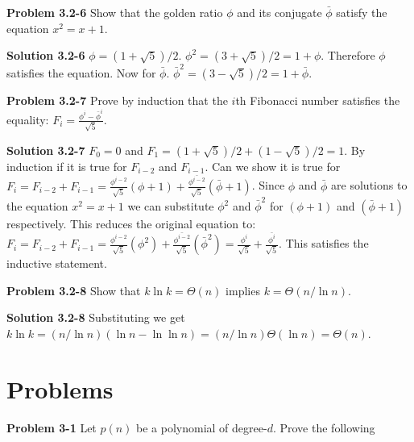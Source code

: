 \documentclass{article}
\newcommand*\conj[1]{\bar{#1}}
\begin{document}
\hrulefill

\medskip

\textbf{Problem 3.2-6} Show that the golden ratio $\phi$ and its conjugate $\conj{\phi}$ satisfy the equation $x^2 = x + 1$.

\medskip

\textbf{Solution 3.2-6} $\phi = (1 + \sqrt{5})/2$. $\phi^2 = (3 + \sqrt{5})/2 = 1 + \phi$. Therefore $\phi$ satisfies the equation. Now for $\conj{\phi}$. $\conj{\phi}^2 = (3 - \sqrt{5})/2 = 1 + \conj{\phi}$.

\hrulefill

\medskip

\textbf{Problem 3.2-7} Prove by induction that the $i$th Fibonacci number satisfies the equality:
$F_i = \frac{\phi^i - \conj{\phi}^i}{\sqrt{5}}$.

\medskip

\textbf{Solution 3.2-7} $F_0 = 0$ and $F_1 = (1+\sqrt{5})/2 + (1-\sqrt{5})/2 = 1$. By induction if it is true for $F_{i-2}$ and $F_{i-1}$. Can we show it is true for $F_i = F_{i-2} + F_{i-1} = \frac{\phi^{i-2}}{\sqrt{5}}(\phi + 1) + \frac{\conj{\phi^{i-2}}}{\sqrt{5}}(\conj{\phi} + 1)$. Since $\phi$ and $\conj{\phi}$ are solutions to the equation $x^2 = x + 1$ we can substitute $\phi^2$ and $\conj{\phi}^2$ for $(\phi + 1)$ and $(\conj{\phi} + 1)$ respectively. This reduces the original equation to: $F_i = F_{i-2} + F_{i-1} = \frac{\phi^{i-2}}{\sqrt{5}}(\phi^2) + \frac{\conj{\phi^{i-2}}}{\sqrt{5}}(\conj{\phi}^2) = \frac{\phi^{i}}{\sqrt{5}} + \frac{\conj{\phi^{i}}}{\sqrt{5}}$. This satisfies the inductive statement.

\hrulefill

\medskip

\textbf{Problem 3.2-8} Show that $k \ln k = \Theta(n)$ implies $k = \Theta(n / \ln n)$.

\medskip

\textbf{Solution 3.2-8} Substituting we get $k \ln k = (n / \ln n) (\ln n - \ln \ln n) = (n / \ln n)\Theta(\ln n) = \boxed{\Theta(n)}$.

\hrulefill

\section*{Problems}

\hrulefill

\medskip

\textbf{Problem 3-1} Let $p(n)$ be a polynomial of degree-$d$. Prove the following
\end{document}

